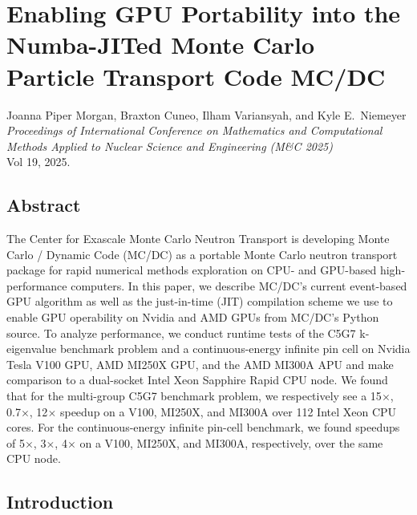\renewcommand{\TheTitle}{Enabling GPU Portability into the Numba-JITed Monte Carlo Particle Transport Code MC/DC}

\renewcommand{\TheAuthors}{%
  Joanna Piper Morgan,
  Braxton Cuneo,
  Ilham Variansyah, 
  and Kyle E.~Niemeyer}
  
\renewcommand{\TheAddress}{%
    \textit{Proceedings of International Conference on Mathematics and Computational Methods Applied to Nuclear Science and Engineering (M\&C 2025)} \\
    Vol 19, 2025. \\
    \doi{10.13182/MC25-47142}
}

\chapter{\TheTitle}
\label{chapter:mcdc_prof}

\vspace{1em}
\TheAuthors
\\
\vspace{1em}
\TheAddress
\vspace{1em}



\section*{Abstract}%
The Center for Exascale Monte Carlo Neutron Transport is developing Monte Carlo / Dynamic Code (MC/DC) as a portable Monte Carlo neutron transport package for rapid numerical methods exploration on CPU- and GPU-based high-performance computers.
In this paper, we describe MC/DC's current event-based GPU algorithm as well as the just-in-time (JIT) compilation scheme we use to enable GPU operability on Nvidia and AMD GPUs from MC/DC's Python source.
To analyze performance, we conduct runtime tests of the C5G7 k-eigenvalue benchmark problem and a continuous-energy infinite pin cell on Nvidia Tesla V100 GPU, AMD MI250X GPU, and the AMD MI300A APU and make comparison to a dual-socket Intel Xeon Sapphire Rapid CPU node.
We found that for the multi-group C5G7 benchmark problem, we respectively see a 15$\times$, 0.7$\times$, 12$\times$ speedup on a V100, MI250X, and MI300A over 112 Intel Xeon CPU cores.
For the continuous-energy infinite pin-cell benchmark, we found speedups of 5$\times$, 3$\times$, 4$\times$ on a V100, MI250X, and MI300A, respectively, over the same CPU node.


\section{Introduction}\label{sec:1}

